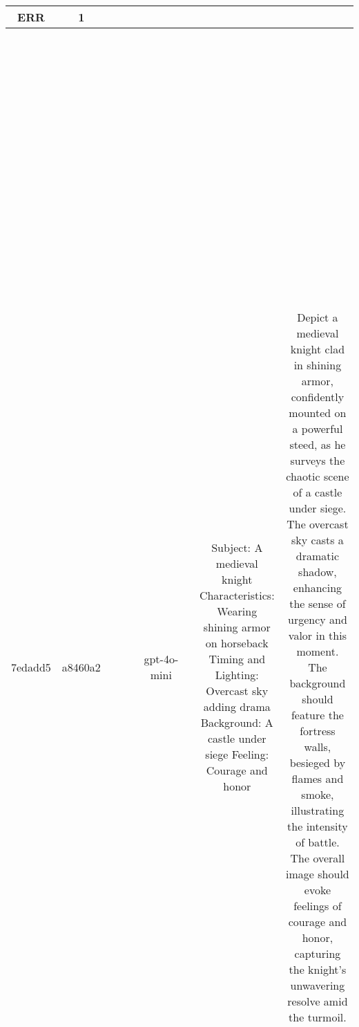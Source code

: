 \begin{table}[h!]
\begin{tabular}{|c|c|c|c|c|c|c|c|c|c|}
ERR & 1\\
\hline
7edadd5 & a8460a2 &  &  & gpt-4o-mini & Subject: A medieval knight  
Characteristics: Wearing shining armor on horseback  
Timing and Lighting: Overcast sky adding drama  
Background: A castle under siege  
Feeling: Courage and honor & Depict a medieval knight clad in shining armor, confidently mounted on a powerful steed, as he surveys the chaotic scene of a castle under siege. The overcast sky casts a dramatic shadow, enhancing the sense of urgency and valor in this moment. The background should feature the fortress walls, besieged by flames and smoke, illustrating the intensity of battle. The overall image should evoke feelings of courage and honor, capturing the knight’s unwavering resolve amid the turmoil. & ok & The chatbot's output adheres to the requirements set in the description. The description is composed within a single paragraph and begins by focusing on the primary subject—the medieval knight—and provides specific characteristics like "clad in shining armor" and "confidently mounted on a powerful steed." The timing and lighting are addressed with "overcast sky casts a dramatic shadow," and the background is described with "the fortress walls, besieged by flames and smoke," indicating the intensity of the battle. Finally, the output concludes by conveying the desired feeling of "courage and honor." The description remains within an appropriate length, presumably not exceeding 80 words, as it is concise and well-structured. Everything in the output complies with the chatbot description without requiring the input to validate or contest.

No violation.
OK & 1\\
\hline
7edadd5 & a8460a2 &  &  & gemma2:9b & Subject: A medieval knight  
Characteristics: Wearing shining armor on horseback  
Timing and Lighting: Overcast sky adding drama  
Background: A castle under siege  
Feeling: Courage and honor & A valiant medieval knight, his armor gleaming resplendently in the subdued light of an overcast sky, gallops across a battlefield. The imposing silhouette of a castle, besieged by enemy forces, looms ominously in the background, smoke billowing from its ramparts. This dramatic scene evokes a powerful sense of courage and honor as the knight bravely rides towards danger.  



\end{tabular}
\end{table}
